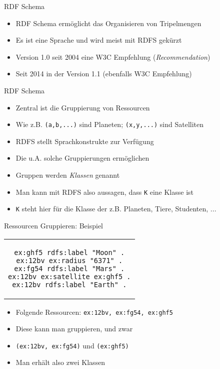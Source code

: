 \documentclass{beamer}
\begin{document}
\begin{frame}{RDF Schema}
	
	\begin{itemize}
		\item RDF Schema ermöglicht das Organisieren von Tripelmengen
		\item Es ist eine Sprache und wird meist mit RDFS gekürzt
		\item Version 1.0 seit 2004 eine W3C Empfehlung (\emph{Recommendation})
		\item Seit 2014 in der Version 1.1 (ebenfalls W3C Empfehlung)
	\end{itemize}
	
\end{frame}

\begin{frame}{RDF Schema}
	
	\begin{itemize}
		\item Zentral ist die Gruppierung von Ressourcen
		\item Wie z.B. \texttt{(a,b,...)} sind Planeten; \texttt{(x,y,...)} sind Satelliten
		\item RDFS stellt Sprachkonstrukte zur Verfügung 
		\item Die u.A. solche Gruppierungen ermöglichen
		\item Gruppen werden \emph{Klassen} genannt
		\item Man kann mit RDFS also aussagen, dass \texttt{K} eine Klasse ist
		\item \texttt{K} steht hier für die Klasse der z.B. Planeten, Tiere, Studenten, ...
	\end{itemize}
	
\end{frame}

\begin{frame}[fragile]{Ressourcen Gruppieren: Beispiel}
	
    \begin{center}
    	\begin{tabular}{c}
			\begin{lstlisting}
ex:ghf5 rdfs:label "Moon" .
ex:12bv ex:radius "6371" .
ex:fg54 rdfs:label "Mars" .
ex:12bv ex:satellite ex:ghf5 .
ex:12bv rdfs:label "Earth" .
			\end{lstlisting}
		\end{tabular}
	\end{center}
	
	\begin{itemize}
		\item Folgende Ressourcen: \texttt{ex:12bv, ex:fg54, ex:ghf5} 
		\item Diese kann man gruppieren, und zwar
		\item \texttt{(ex:12bv, ex:fg54)} und \texttt{(ex:ghf5)}
		\item Man erhält also zwei Klassen
	\end{itemize}
	
\end{frame}
\end{document}
